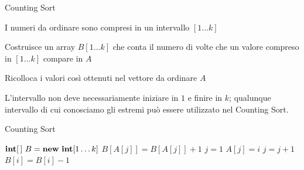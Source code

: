 \begin{frame}{Counting Sort}

\vspace{-9pt}
\begin{myboxtitle}[Assunzione]
\BI
\item I numeri da ordinare sono compresi in un intervallo $[1 \ldots k]$
\EI
\end{myboxtitle}

\begin{myboxtitle}
\BI
\item  Costruisce un array $B[1 \ldots k]$ che conta il numero di volte che un valore compreso in $[1 \ldots k]$ compare in $A$
\item Ricolloca i valori così ottenuti nel vettore da ordinare  $A$	
\EI
\end{myboxtitle}

\begin{myboxtitle}[Miglioramenti]
\BI
\item L'intervallo non deve necessariamente iniziare in $1$ e finire in $k$; qualunque intervallo di cui conosciamo gli estremi può essere utilizzato
nel Counting Sort.
\EI
\end{myboxtitle}


\end{frame}%


\begin{frame}{Counting Sort}

\vspace{-12pt}
\begin{Procedure}
\caption[A]{\countingsort($\INTEGER[\,]\ A,\ \INTEGER\ n,\ \INTEGER\ k$)}
$\INTEGER[\,]\ B = \NEW\ \INTEGER[1 \mldots k]$\;
{
  $B[A[j]] = B[A[j]]+1$\;
}
$j = 1$\;
{
  {
    $A[j] = i$\;
    $j = j+1$\;
    $B[i] = B[i]-1$\;
  }
}
\end{Procedure}


\end{frame}%


